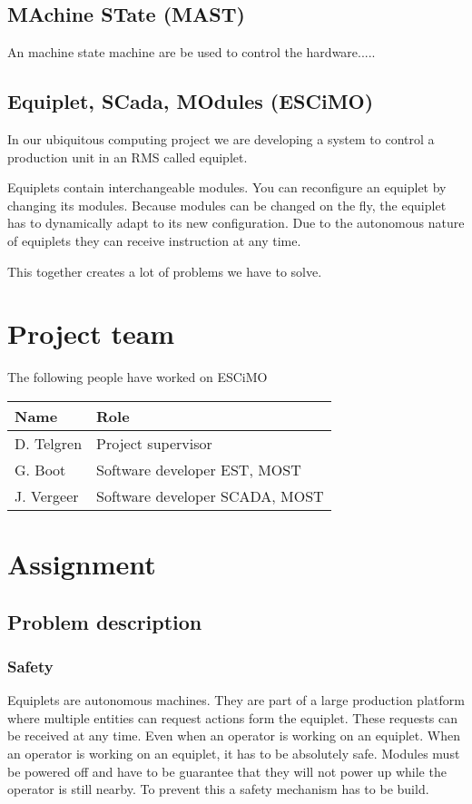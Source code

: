 \documentclass[12pt,a4paper]{report}
\begin{document}
\section{MAchine STate (MAST)}
An machine state machine are be used to control the hardware.....

\section{Equiplet, SCada, MOdules (ESCiMO)}
In our ubiquitous computing project we are developing a system to control a production unit in an RMS called equiplet. 

Equiplets contain interchangeable modules. 
You can reconfigure an equiplet by changing its modules.
Because modules can be changed on the fly, the equiplet has to dynamically adapt to its new configuration.
Due to the autonomous nature of equiplets they can receive instruction at any time.

This together creates a lot of problems we have to solve.

\chapter{Project team}
The following people have worked on ESCiMO

\begin{tabular}{l | l}
Name       & Role \\
\hline
D. Telgren & Project supervisor \\
G. Boot    & Software developer EST, MOST \\
J. Vergeer & Software developer SCADA, MOST
\end{tabular}

\chapter{Assignment}

\section{Problem description}

\subsection{Safety}
Equiplets are autonomous machines. 
They are part of a large production platform where multiple entities can request actions form the equiplet.
These requests can be received at any time.
Even when an operator is working on an equiplet.
When an operator is working on an equiplet, it has to be absolutely safe.
Modules must be powered off and have to be guarantee that they will not power up while the operator is still nearby.
To prevent this a safety mechanism has to be build.
\end{document}
